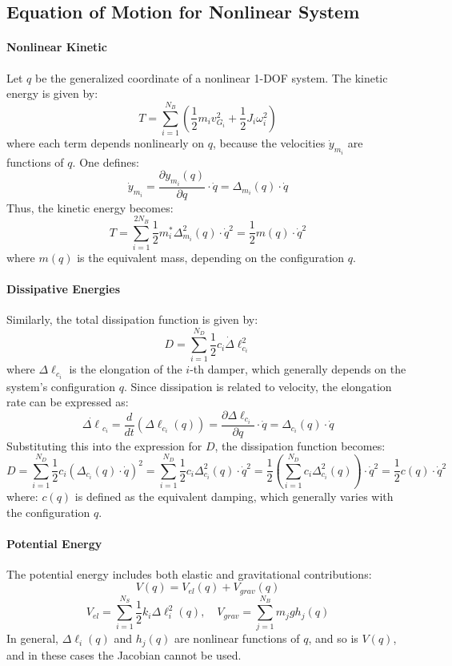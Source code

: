 \subsection{Equation of Motion for Nonlinear System}

\paragraph{Nonlinear Kinetic} Let \( q \) be the generalized coordinate of a nonlinear 1-DOF system. The kinetic energy is given by:
\[
T = \sum_{i=1}^{N_B} \left( \frac{1}{2} m_i v_{G_i}^2 + \frac{1}{2} J_i \omega_i^2 \right)
\]
where each term depends nonlinearly on \( q \), because the velocities \( \dot{y}_{m_i} \) are functions of \( q \). One defines:
\[
\dot{y}_{m_i} = \frac{\partial y_{m_i}(q)}{\partial q} \cdot \dot{q} = \Delta_{m_i}(q) \cdot \dot{q}
\]
Thus, the kinetic energy becomes:
\[
T = \sum_{i=1}^{2N_B} \frac{1}{2} m_i^* \Delta_{m_i}^2(q) \cdot \dot{q}^2 = \frac{1}{2} m(q) \cdot \dot{q}^2
\]
where \( m(q) \) is the equivalent mass, depending on the configuration \( q \). 

\paragraph{Dissipative Energies} Similarly, the total dissipation function is given by:
\[
D = \sum_{i=1}^{N_D} \frac{1}{2} c_i \dot{\Delta} \ell_{c_i}^2
\]
where \( \Delta \ell_{c_i} \) is the elongation of the \( i \)-th damper, which generally depends on the system’s configuration \( q \). Since dissipation is related to velocity, the elongation rate can be expressed as:
\[
\dot{\Delta \ell}_{c_i} = \frac{d}{dt} \left( \Delta \ell_{c_i}(q) \right) = \frac{\partial \Delta \ell_{c_i}}{\partial q} \cdot \dot{q} = \Delta_{c_i}(q) \cdot \dot{q}
\]
Substituting this into the expression for \( D \), the dissipation function becomes:
\[
D = \sum_{i=1}^{N_D} \frac{1}{2} c_i \left( \Delta_{c_i}(q) \cdot \dot{q} \right)^2
= \sum_{i=1}^{N_D} \frac{1}{2} c_i \Delta_{c_i}^2(q) \cdot \dot{q}^2
= \frac{1}{2} \left( \sum_{i=1}^{N_D} c_i \Delta_{c_i}^2(q) \right) \cdot \dot{q}^2 = \frac{1}{2} c(q) \cdot \dot{q}^2
\]
where: \( c(q) \) is defined as the equivalent damping, which generally varies with the configuration \( q \).

\paragraph{Potential Energy} The potential energy includes both elastic and gravitational contributions:
\[
V(q) = V_{el}(q) + V_{grav}(q)
\]
\[
V_{el} = \sum_{i=1}^{N_S} \frac{1}{2} k_i \Delta \ell_i^2(q), \quad V_{grav} = \sum_{j=1}^{N_B} m_j g h_j(q)
\]
In general, \( \Delta \ell_i(q) \) and \( h_j(q) \) are nonlinear functions of \( q \), and so is \( V(q) \), and in these cases the Jacobian cannot be used. 

